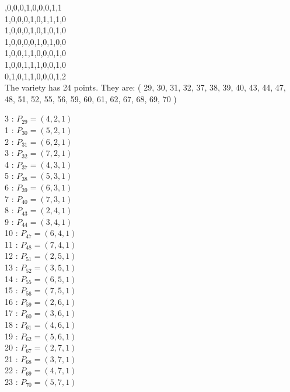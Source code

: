 \documentclass{article}
\begin{document}
{,0,0,0,1,0,0,0,1,1\\
1,0,0,0,1,0,1,1,1,0\\
1,0,0,0,1,0,1,0,1,0\\
1,0,0,0,0,1,0,1,0,0\\
1,0,0,1,1,0,0,0,1,0\\
1,0,0,1,1,1,0,0,1,0\\
0,1,0,1,1,0,0,0,1,2\\
The variety has 24 points. They are: 
( 29, 30, 31, 32, 37, 38, 39, 40, 43, 44, 47, 48, 51, 52, 55, 56, 59, 60, 61, 62, 67, 68, 69, 70 )\\
\begin{multicols}{3}
 : $P_{29}=( 4, 2, 1 )$\\
1 : $P_{30}=( 5, 2, 1 )$\\
2 : $P_{31}=( 6, 2, 1 )$\\
3 : $P_{32}=( 7, 2, 1 )$\\
4 : $P_{37}=( 4, 3, 1 )$\\
5 : $P_{38}=( 5, 3, 1 )$\\
6 : $P_{39}=( 6, 3, 1 )$\\
7 : $P_{40}=( 7, 3, 1 )$\\
8 : $P_{43}=( 2, 4, 1 )$\\
9 : $P_{44}=( 3, 4, 1 )$\\
10 : $P_{47}=( 6, 4, 1 )$\\
11 : $P_{48}=( 7, 4, 1 )$\\
12 : $P_{51}=( 2, 5, 1 )$\\
13 : $P_{52}=( 3, 5, 1 )$\\
14 : $P_{55}=( 6, 5, 1 )$\\
15 : $P_{56}=( 7, 5, 1 )$\\
16 : $P_{59}=( 2, 6, 1 )$\\
17 : $P_{60}=( 3, 6, 1 )$\\
18 : $P_{61}=( 4, 6, 1 )$\\
19 : $P_{62}=( 5, 6, 1 )$\\
20 : $P_{67}=( 2, 7, 1 )$\\
21 : $P_{68}=( 3, 7, 1 )$\\
22 : $P_{69}=( 4, 7, 1 )$\\
23 : $P_{70}=( 5, 7, 1 )$\\
\end{multicols}


%


%


}%
\end{document}
